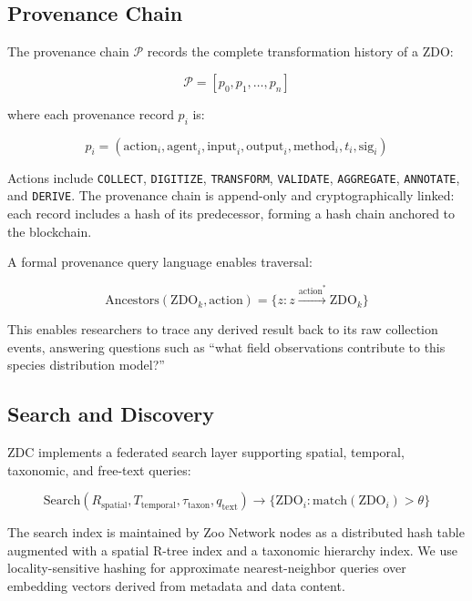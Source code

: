 \subsection{Provenance Chain}

The provenance chain $\mathcal{P}$ records the complete transformation history of a ZDO:

\begin{equation}
    \mathcal{P} = [p_0, p_1, \ldots, p_n]
\end{equation}

\noindent where each provenance record $p_i$ is:

\begin{equation}
    p_i = (\text{action}_i, \text{agent}_i, \text{input}_i, \text{output}_i, \text{method}_i, t_i, \text{sig}_i)
\end{equation}

Actions include \texttt{COLLECT}, \texttt{DIGITIZE}, \texttt{TRANSFORM}, \texttt{VALIDATE}, \texttt{AGGREGATE}, \texttt{ANNOTATE}, and \texttt{DERIVE}.
The provenance chain is append-only and cryptographically linked: each record includes a hash of its predecessor, forming a hash chain anchored to the blockchain.

A formal provenance query language enables traversal:

\begin{equation}
    \text{Ancestors}(\text{ZDO}_k, \text{action}) = \{z : z \xrightarrow{\text{action}^*} \text{ZDO}_k\}
\end{equation}

This enables researchers to trace any derived result back to its raw collection events, answering questions such as ``what field observations contribute to this species distribution model?''

\subsection{Search and Discovery}

ZDC implements a federated search layer supporting spatial, temporal, taxonomic, and free-text queries:

\begin{equation}
    \text{Search}(R_{\text{spatial}}, T_{\text{temporal}}, \tau_{\text{taxon}}, q_{\text{text}}) \rightarrow \{\text{ZDO}_i : \text{match}(\text{ZDO}_i) > \theta\}
\end{equation}

The search index is maintained by Zoo Network nodes as a distributed hash table augmented with a spatial R-tree index and a taxonomic hierarchy index.
We use locality-sensitive hashing for approximate nearest-neighbor queries over embedding vectors derived from metadata and data content.

